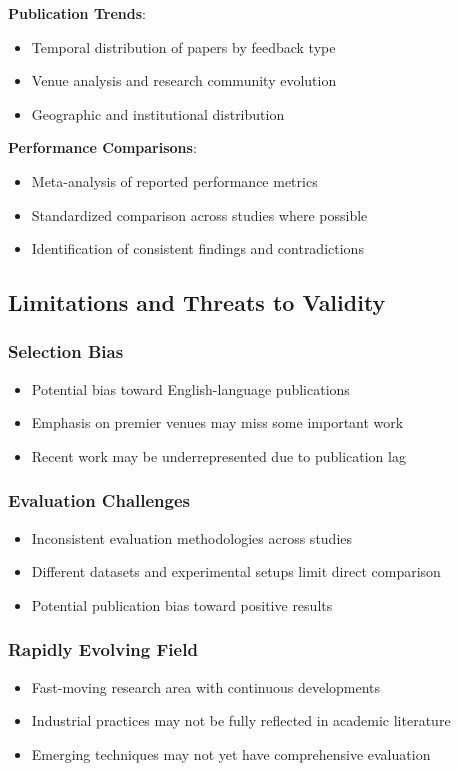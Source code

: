 \textbf{Publication Trends}:
\begin{itemize}
    \item Temporal distribution of papers by feedback type
    \item Venue analysis and research community evolution
    \item Geographic and institutional distribution
\end{itemize}

\textbf{Performance Comparisons}:
\begin{itemize}
    \item Meta-analysis of reported performance metrics
    \item Standardized comparison across studies where possible
    \item Identification of consistent findings and contradictions
\end{itemize}

\subsection{Limitations and Threats to Validity}

\subsubsection{Selection Bias}
\begin{itemize}
    \item Potential bias toward English-language publications
    \item Emphasis on premier venues may miss some important work
    \item Recent work may be underrepresented due to publication lag
\end{itemize}

\subsubsection{Evaluation Challenges}
\begin{itemize}
    \item Inconsistent evaluation methodologies across studies
    \item Different datasets and experimental setups limit direct comparison
    \item Potential publication bias toward positive results
\end{itemize}

\subsubsection{Rapidly Evolving Field}
\begin{itemize}
    \item Fast-moving research area with continuous developments
    \item Industrial practices may not be fully reflected in academic literature
    \item Emerging techniques may not yet have comprehensive evaluation
\end{itemize}

